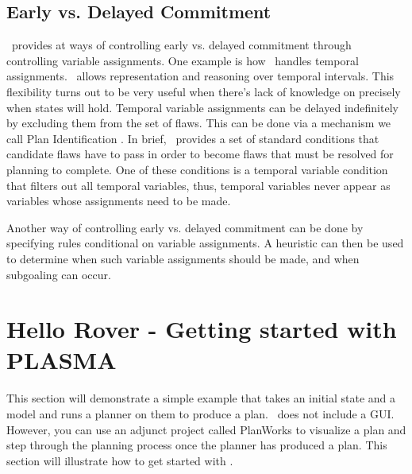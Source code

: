 \documentclass[10pt, letterpaper, twoside]{article}
\begin{document}
\subsection{Early vs. Delayed Commitment}
\label{commitment}
\ET\, provides at ways of controlling early vs. delayed commitment through
controlling variable assignments.  One example is how \ET\, handles
temporal assignments.  \ET\, allows representation and reasoning over
temporal intervals.  This flexibility turns out to be very useful when
there's lack of knowledge on precisely when states will hold.  Temporal
variable assignments can be delayed indefinitely by excluding them from the
set of flaws.  This can be done via a mechanism we call Plan
Identification \cite{planid}.  In brief, \ET\, provides a set of standard
conditions that candidate flaws have to pass in order to become flaws that
must be resolved for planning to complete.  One of these conditions is a
temporal variable condition that filters out all temporal variables, thus,
temporal variables never appear as variables whose assignments need to be
made. 

Another way of controlling early vs. delayed commitment can be done by
specifying rules conditional on variable assignments.  A heuristic can then
be used to determine when such variable assignments should be made, and
when subgoaling can occur.

\section{Hello Rover - Getting started with PLASMA}
\label{started}
This section will demonstrate a simple example that takes an initial state
and a model and runs a planner on them to produce a plan.  \ET\, does not
include a GUI.  However, you can use an adjunct project called PlanWorks to
visualize a plan and step through the planning process once the planner has
produced a plan.  This section will illustrate how to get started with \ET.
\end{document}
